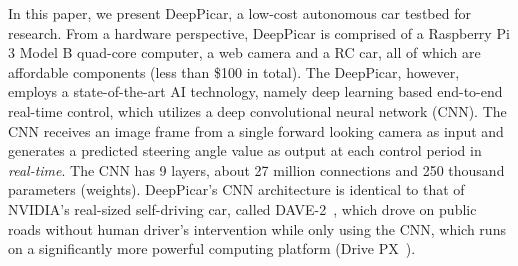 

In this paper, we present DeepPicar, a low-cost autonomous car
testbed for research. From a hardware perspective,
DeepPicar is comprised of a Raspberry Pi 3 Model B quad-core
computer, a web camera and a RC car, all of which are affordable
components (less than \$100 in total).
The DeepPicar, however, employs a state-of-the-art AI
technology, namely deep learning based end-to-end real-time control,
which utilizes a deep convolutional neural network (CNN).
The CNN receives an image frame from a single forward
looking camera as input and generates a predicted steering angle
value as output at each control period in \emph{real-time}.
The CNN has 9 layers, about 27 million connections
and 250 thousand parameters (weights).
DeepPicar's CNN architecture is identical to that of NVIDIA's
real-sized self-driving car, called DAVE-2~\cite{Bojarski2016}, which
drove on public roads without human driver's intervention while only
using the CNN, which runs on a significantly more powerful computing
platform (Drive PX~\cite{drivepx}).



